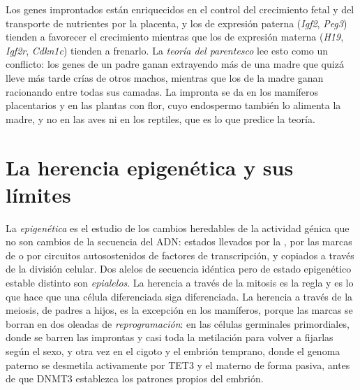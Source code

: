 \begin{remark}\label{rem:b3:chromatin-epigenetics:kinship}
Los genes improntados están enriquecidos en el control del crecimiento
fetal y del transporte de nutrientes por la placenta, y los de expresión
paterna (\emph{Igf2}, \emph{Peg3}) tienden a favorecer el crecimiento
mientras que los de expresión materna (\emph{H19}, \emph{Igf2r},
\emph{Cdkn1c}) tienden a frenarlo. La \emph{teoría del parentesco} lee
esto como un conflicto: los genes de un padre ganan extrayendo más de una
madre que quizá lleve más tarde crías de otros machos, mientras que los
de la madre ganan racionando entre todas sus camadas. La impronta se da
en los mamíferos placentarios y en las plantas con flor, cuyo endospermo
también lo alimenta la madre, y no en las aves ni en los reptiles, que es
lo que predice la teoría.
\end{remark}

\section{La herencia epigenética y sus límites}

\begin{definition}[Epigenética]\label{def:b3:chromatin-epigenetics:epigenetics}
La \emph{epigenética} es el estudio de los cambios heredables de la
actividad génica que no son cambios de la secuencia del ADN: estados
llevados por la , por las marcas de  o por
circuitos autosostenidos de factores de transcripción, y copiados a
través de la división celular. Dos alelos de secuencia idéntica pero de
estado epigenético estable distinto son \emph{epialelos}. La herencia a
través de la mitosis es la regla y es lo que hace que una célula
diferenciada siga diferenciada. La herencia a través de la meiosis, de
padres a hijos, es la excepción en los mamíferos, porque las marcas se
borran en dos oleadas de \emph{reprogramación}: en las células germinales
primordiales, donde se barren las improntas y casi toda la metilación
para volver a fijarlas según el sexo, y otra vez en el cigoto y el
embrión temprano, donde el genoma paterno se desmetila activamente por
TET3 y el materno de forma pasiva, antes de que DNMT3 establezca los
patrones propios del embrión.
\end{definition}

